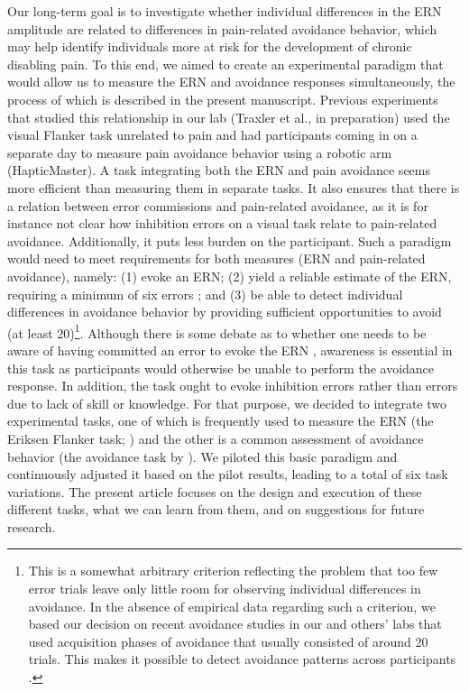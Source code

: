 \documentclass[twocolumn, serif, authordate, empirical]{jote-article}
\begin{document}
Our long-term goal is to investigate whether individual differences in the ERN amplitude are related to differences in pain-related avoidance behavior, which may help identify individuals more at risk for the development of chronic disabling pain. To this end, we aimed to create an experimental paradigm that would allow us to measure the ERN and avoidance responses simultaneously, the process of which is described in the present manuscript. Previous experiments that studied this relationship in our lab (Traxler et al., in preparation) used the visual Flanker task unrelated to pain and had participants coming in on a separate day to measure pain avoidance behavior using a robotic arm (HapticMaster). A task integrating both the ERN and pain avoidance seems more efficient than measuring them in separate tasks. It also ensures that there is a relation between error commissions and pain-related avoidance, as it is for instance not clear how inhibition errors on a visual task relate to pain-related avoidance. Additionally, it puts less burden on the participant. Such a paradigm would need to meet requirements for both measures (ERN and pain-related avoidance), namely: (1) evoke an ERN; (2) yield a reliable estimate of the ERN, requiring a minimum of six errors \parencite{Olvet2009, Steele2016}; and (3) be able to detect individual differences in avoidance behavior by providing sufficient opportunities to avoid (at least 20)\footnote{This is a somewhat arbitrary criterion reflecting the problem that too   few error trials leave only little room for observing individual   differences in avoidance. In the absence of empirical data regarding   such a criterion, we based our decision on recent avoidance studies in   our and others' labs that used acquisition phases of avoidance that   usually consisted of around 20 trials. This makes it possible to   detect avoidance patterns across participants \parencite{Meulders2016, Vervliet2015}.}. Although there is some debate as to whether one needs to be aware of having committed an error to evoke the ERN \parencite{Nieuwenhuis2001}, awareness is essential in this task as participants would otherwise be unable to perform the avoidance response. In addition, the task ought to evoke inhibition errors rather than errors due to lack of skill or knowledge. For that purpose, we decided to integrate two experimental tasks, one of which is frequently used to measure the ERN (the Eriksen Flanker task; ) and the other is a common assessment of avoidance behavior (the avoidance task by ). We piloted this basic paradigm and continuously adjusted it based on the pilot results, leading to a total of six task variations. The present article focuses on the design and execution of these different tasks, what we can learn from them, and on suggestions for future research.~
\end{document}
